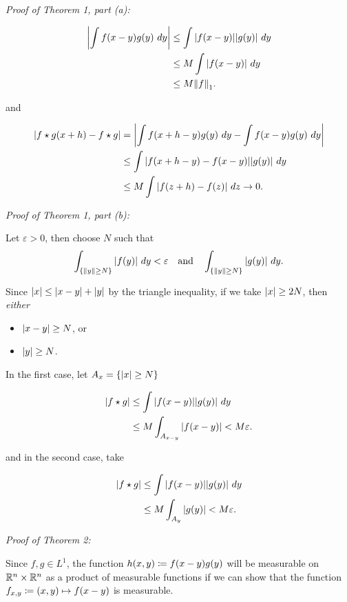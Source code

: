 \emph{Proof of Theorem 1, part (a):}

\begin{align*}
{\left\lvert {\int f(x-y)g(y) ~dy} \right\rvert} 
&\leq \int {\left\lvert {f(x-y)} \right\rvert} {\left\lvert {g(y)} \right\rvert} ~dy \\
&\leq M \int {\left\lvert {f(x-y)} \right\rvert} ~dy \\
&\leq M {\left\lVert {f} \right\rVert}_1
.\end{align*}

and

\begin{align*}
{\left\lvert {f\star g(x+h) - f\star g} \right\rvert}
&= {\left\lvert {
\int f(x+h-y)g(y)~dy - \int f(x-y)g(y)~dy
} \right\rvert} \\
&\leq \int {\left\lvert {f(x+h-y) - f(x-y)} \right\rvert} {\left\lvert {g(y)} \right\rvert}~dy \\
&\leq M \int {\left\lvert {f(z+h) - f(z)} \right\rvert}~dz \to 0
.\end{align*}

\emph{Proof of Theorem 1, part (b):}

Let \(\varepsilon > 0\), then choose \(N\) such that
\begin{align*}
\int_{\left\{{{\left\lVert {y} \right\rVert} \geq N}\right\}} {\left\lvert {f(y)} \right\rvert} ~dy < \varepsilon \quad \text{and} \quad 
\int_{\left\{{{\left\lVert {y} \right\rVert} \geq N}\right\}} {\left\lvert {g(y)} \right\rvert} ~dy 
.\end{align*}

Since \({\left\lvert {x} \right\rvert} \leq {\left\lvert {x-y} \right\rvert} + {\left\lvert {y} \right\rvert}\) by the triangle inequality,
if we take \({\left\lvert {x} \right\rvert} \geq 2N\), then \emph{either}

\begin{itemize}
\tightlist
\item
  \({\left\lvert {x-y} \right\rvert} \geq N\), or
\item
  \({\left\lvert {y} \right\rvert} \geq N\).
\end{itemize}

In the first case, let \(A_x = \left\{{{\left\lvert {x} \right\rvert} \geq N}\right\}\)

\begin{align*}
{\left\lvert {f\star g} \right\rvert} 
&\leq \int {\left\lvert {f(x-y)} \right\rvert} {\left\lvert {g(y)} \right\rvert} ~dy \\
&\leq M \int_{A_{x-y}} {\left\lvert {f(x-y)} \right\rvert} < M\varepsilon
.\end{align*}

and in the second case, take

\begin{align*}
{\left\lvert {f\star g} \right\rvert} 
&\leq \int {\left\lvert {f(x-y)} \right\rvert} {\left\lvert {g(y)} \right\rvert} ~dy \\
&\leq M \int_{A_{y}} {\left\lvert {g(y)} \right\rvert} < M\varepsilon
.\end{align*}

\emph{Proof of Theorem 2:}

Since \(f,g \in L^1\), the function \(h(x, y) \coloneqq f(x-y)g(y)\)
will be measurable on \({\mathbb{R}}^n\times{\mathbb{R}}^n\) as a product of measurable
functions if we can show that the function
\(f_{x,y} \coloneqq (x,y) \mapsto f(x-y)\) is measurable.

